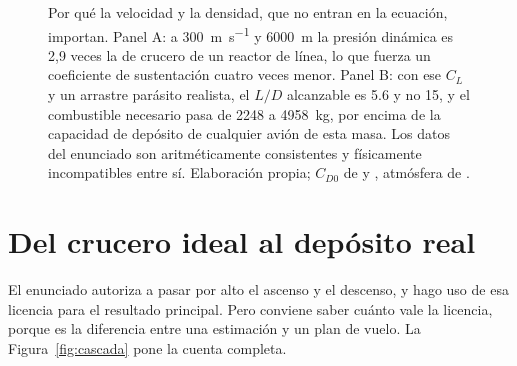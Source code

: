 \documentclass[11pt,letterpaper]{article}
\begin{document}
\begin{figure}[htbp]
\begin{tikzpicture}
\end{tikzpicture}
\caption{Por qué la velocidad y la densidad, que no entran en la ecuación,
importan. Panel A: a \SI{300}{\meter\per\second} y \SI{6000}{\meter} la presión
dinámica es 2,9 veces la de crucero de un reactor de línea, lo que fuerza un
coeficiente de sustentación cuatro veces menor. Panel B: con ese \(C_L\) y un
arrastre parásito realista, el \(L/D\) alcanzable es \num{5.6} y no 15, y el
combustible necesario pasa de \num{2248} a \SI{4958}{\kilogram}, por encima de
la capacidad de depósito de cualquier avión de esta masa. Los datos del
enunciado son aritméticamente consistentes y físicamente incompatibles entre
sí. Elaboración propia; \(C_{D0}\) de \textcite{anderson1999} y
\textcite{raymer2018}, atmósfera de \textcite{iso2533}.}
\label{fig:coherencia}
\end{figure}

\section{Del crucero ideal al depósito real}
\label{sec:cascada}

El enunciado autoriza a pasar por alto el ascenso y el descenso, y hago uso de
esa licencia para el resultado principal. Pero conviene saber cuánto vale la
licencia, porque es la diferencia entre una estimación y un plan de vuelo. La
Figura~\ref{fig:cascada} pone la cuenta completa.
\end{document}
